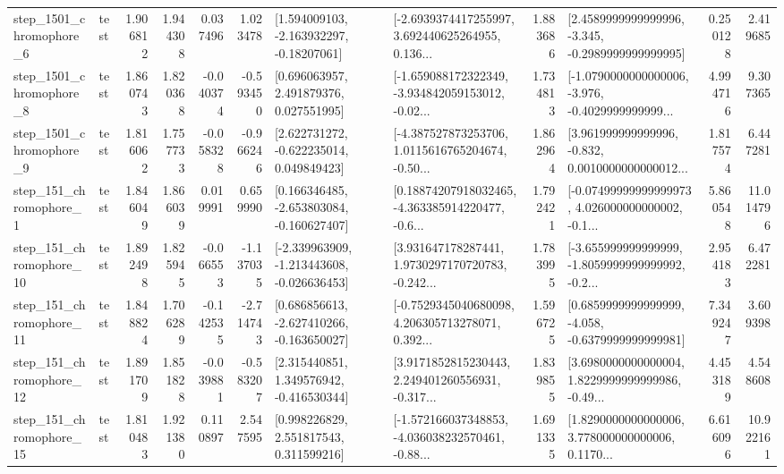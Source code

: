 \begin{tabular}{llrrrrllrlrr}
  step\_1501\_chromophore\_6 &      test &      1.906812 &    1.944308 &      0.037496 &  1.023478 &    [1.594009103, -2.163932297, -0.18207061] &  [-2.6939374417255997, 3.692440625264955, 0.136... &       1.883686 &  [2.4589999999999996, -3.345, -0.2989999999999995] &            0.250128 &          2.419685 \\
  step\_1501\_chromophore\_8 &      test &      1.860743 &    1.820368 &     -0.040374 & -0.593450 &     [0.696063957, 2.491879376, 0.027551995] &  [-1.659088172322349, -3.934842059153012, -0.02... &       1.734813 &  [-1.0790000000000006, -3.976, -0.4029999999999... &            4.994716 &          9.307365 \\
  step\_1501\_chromophore\_9 &      test &      1.816062 &    1.757733 &     -0.058328 & -0.966246 &    [2.622731272, -0.622235014, 0.049849423] &  [-4.387527873253706, 1.0115616765204674, -0.50... &       1.862964 &  [3.961999999999996, -0.832, 0.0010000000000012... &            1.817574 &          6.447281 \\
   step\_151\_chromophore\_1 &      test &      1.846049 &    1.866039 &      0.019991 &  0.659990 &   [0.166346485, -2.653803084, -0.160627407] &  [0.18874207918032465, -4.363385914220477, -0.6... &       1.792421 &  [-0.07499999999999973, 4.026000000000002, -0.1... &            5.860548 &         11.014796 \\
  step\_151\_chromophore\_10 &      test &      1.892498 &    1.825945 &     -0.066553 & -1.137035 &  [-2.339963909, -1.213443608, -0.026636453] &  [3.931647178287441, 1.9730297170720783, -0.242... &       1.783995 &  [-3.655999999999999, -1.8059999999999992, -0.2... &            2.954183 &          6.472281 \\
  step\_151\_chromophore\_11 &      test &      1.848824 &    1.706289 &     -0.142535 & -2.714743 &   [0.686856613, -2.627410266, -0.163650027] &  [-0.7529345040680098, 4.206305713278071, 0.392... &       1.596725 &  [0.6859999999999999, -4.058, -0.6379999999999981] &            7.349247 &          3.609398 \\
  step\_151\_chromophore\_12 &      test &      1.891709 &    1.851828 &     -0.039881 & -0.583207 &    [2.315440851, 1.349576942, -0.416530344] &  [3.9171852815230443, 2.249401260556931, -0.317... &       1.839855 &  [3.6980000000000004, 1.8229999999999986, -0.49... &            4.453189 &          4.548608 \\
  step\_151\_chromophore\_15 &      test &      1.810483 &    1.921380 &      0.110897 &  2.547595 &     [0.998226829, 2.551817543, 0.311599216] &  [-1.572166037348853, -4.036038232570461, -0.88... &       1.691335 &  [1.8290000000000006, 3.778000000000006, 0.1170... &            6.616096 &         10.922161 \\

\end{tabular}
